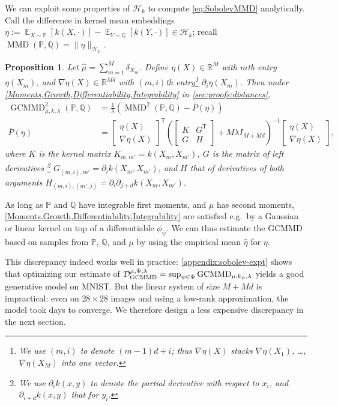 \documentclass{article}
\DeclareMathOperator{\E}{\mathbb E}
\newcommand{\h}{\mathcal H}
\newcommand{\R}{\mathbb R}
\newcommand{\PP}{\mathbb P}
\newcommand{\QQ}{\mathbb Q}
\newcommand{\tp}{^\mathsf{T}}
\DeclareMathOperator{\MMD}{MMD}
\DeclareMathOperator{\GCMMD}{GCMMD}
\newtheorem{prop}[lem]{Proposition}
\begin{document}
We can exploit some properties of $\h_k$
to compute \eqref{eq:SobolevMMD} analytically.
Call the difference in kernel mean embeddings
$\eta := \E_{X \sim \PP}[ k(X, \cdot) ] - \E_{Y \sim \QQ}[ k(Y, \cdot) ] \in \h_k$;
recall $\MMD(\PP, \QQ) = \lVert \eta \rVert_{\h_k}$.
\begin{prop} \label{prop:Finite_rank_approx}
  Let $\hat\mu = \sum_{m=1}^M \delta_{X_m}$. Define $\eta(X) \in \R^M$ with $m$th entry $\eta(X_m)$,
  and $\nabla \eta(X) \in \R^{M d}$ with $(m, i)$th entry\footnote{We use $(m, i)$ to denote $(m-1) d + i$;
    thus $\nabla \eta(X)$ stacks $\nabla \eta(X_1)$, \dots, $\nabla \eta(X_M)$ into one vector.
  } $\partial_i \eta(X_m)$.
  Then under \cref{Moments,Growth,Differentiability,Integrability} in \cref{sec:proofs:distances},
\begin{align*}
    \GCMMD_{\hat\mu,k,\lambda}^2(\PP, \QQ)
    &= \frac1\lambda \left( \MMD^{2}(\PP, \QQ) - \bar{P}(\eta) \right)
  \\
    \bar{P}(\eta)
    &=
    \begin{bmatrix} \eta(X) \\ \nabla\eta(X) \end{bmatrix}\tp
    \left(
      \begin{bmatrix}
        K & G\tp \\
        G & H
      \end{bmatrix}
      + M \lambda I_{M + M d}
    \right)^{-1}
    \begin{bmatrix} \eta(X) \\ \nabla\eta(X) \end{bmatrix}
  ,\end{align*}
  where $K$ is the kernel matrix $K_{m,m'} = k(X_m, X_{m'})$,
  $G$ is the matrix of left derivatives \footnote{We use $\partial_i k(x, y)$ to denote the partial derivative with respect to $x_i$,
    and $\partial_{i+d} k(x, y)$ that for $y_i$.
  }
  $G_{(m, i), m'} = \partial_i k(X_m, X_{m'})$,
  and $H$ that of derivatives of both arguments $H_{(m, i), (m', j)} = \partial_i \partial_{j+d} k(X_m, X_{m'})$.
\end{prop}
As long as $\PP$ and $\QQ$ have integrable first moments, and $\mu$ has second moments,
\cref{Moments,Growth,Differentiability,Integrability} are satisfied e.g.\ by a Gaussian or linear kernel on top of a differentiable $\phi_\psi$.
We can thus estimate the GCMMD based on samples from $\PP$, $\QQ$, and $\mu$ by using the empirical mean $\hat\eta$ for $\eta$.

This discrepancy indeed works well in practice:
\cref{appendix:sobolev-expt} shows that optimizing our estimate of
$\optGCMMD = \sup_{\psi \in \Psi} \GCMMD_{\mu,k_\psi,\lambda}$
yields a good generative model on MNIST.
But the linear system of size $M+Md$ is impractical:
even on $28 \times 28$ images
and using a low-rank approximation,
the model took days to converge.
We therefore design a less expensive discrepancy in the next section.
\end{document}
